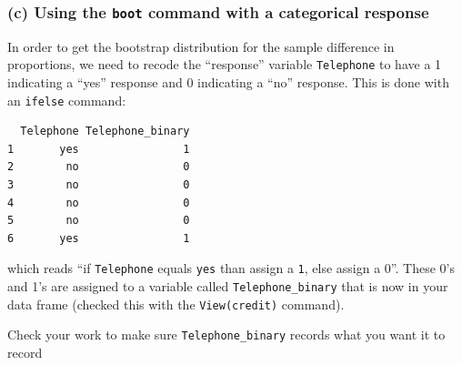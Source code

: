 \documentclass[
]{book}
\newenvironment{Shaded}{\begin{snugshade}}{\end{snugshade}}
\newcommand{\DecValTok}[1]{\textcolor[rgb]{0.00,0.00,0.81}{#1}}
\newcommand{\FunctionTok}[1]{\textcolor[rgb]{0.00,0.00,0.00}{#1}}
\newcommand{\NormalTok}[1]{#1}
\newcommand{\OtherTok}[1]{\textcolor[rgb]{0.56,0.35,0.01}{#1}}
\newcommand{\SpecialCharTok}[1]{\textcolor[rgb]{0.00,0.00,0.00}{#1}}
\newcommand{\StringTok}[1]{\textcolor[rgb]{0.31,0.60,0.02}{#1}}
\begin{document}
\hypertarget{c-using-the-boot-command-with-a-categorical-response}{%
\subsubsection{\texorpdfstring{(c) Using the \texttt{boot} command with a categorical response}{(c) Using the boot command with a categorical response}}\label{c-using-the-boot-command-with-a-categorical-response}}

In order to get the bootstrap distribution for the sample difference in proportions, we need to recode the ``response'' variable \texttt{Telephone} to have a 1 indicating a ``yes'' response and 0 indicating a ``no'' response. This is done with an \texttt{ifelse} command:

\begin{Shaded}
\end{Shaded}

\begin{verbatim}
  Telephone Telephone_binary
1       yes                1
2        no                0
3        no                0
4        no                0
5        no                0
6       yes                1
\end{verbatim}

which reads ``if \texttt{Telephone} equals \texttt{yes} than assign a \texttt{1}, else assign a 0''. These 0's and 1's are assigned to a variable called \texttt{Telephone\_binary} that is now in your data frame (checked this with the \texttt{View(credit)} command).

Check your work to make sure \texttt{Telephone\_binary} records what you want it to record

\begin{Shaded}
\end{Shaded}
\end{document}
